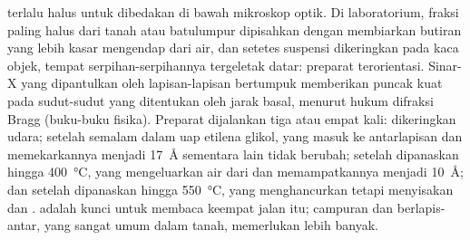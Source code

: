\begin{inthelab}
 terlalu halus untuk dibedakan di bawah mikroskop optik. Di laboratorium, fraksi paling halus dari tanah atau batulumpur dipisahkan dengan membiarkan butiran yang lebih kasar mengendap dari air, dan setetes suspensi dikeringkan pada kaca objek, tempat serpihan-serpihannya tergeletak datar: preparat terorientasi. Sinar-X yang dipantulkan oleh lapisan-lapisan bertumpuk memberikan puncak kuat pada sudut-sudut yang ditentukan oleh jarak basal, menurut hukum difraksi Bragg (buku-buku fisika). Preparat dijalankan tiga atau empat kali: dikeringkan udara; setelah semalam dalam uap etilena glikol, yang masuk ke antarlapisan  dan memekarkannya menjadi \SI{17}{\angstrom} sementara  lain tidak berubah; setelah dipanaskan hingga \SI{400}{\celsius}, yang mengeluarkan air dari  dan memampatkannya menjadi \SI{10}{\angstrom}; dan setelah dipanaskan hingga \SI{550}{\celsius}, yang menghancurkan  tetapi menyisakan  dan .  adalah kunci untuk membaca keempat jalan itu; campuran dan  berlapis-antar, yang sangat umum dalam tanah, memerlukan lebih banyak.
\end{inthelab}

